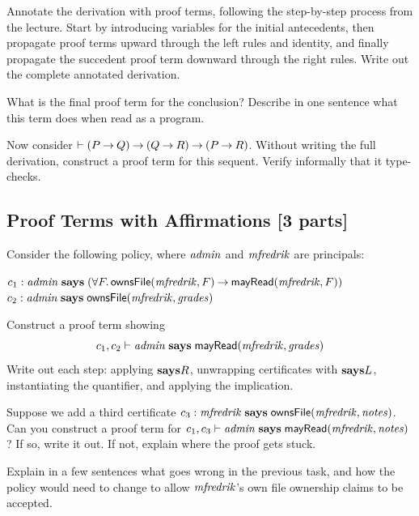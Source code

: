 \documentclass[11pt]{article}
\begin{document}
\begin{task}\rm
  Annotate the derivation with proof terms, following the step-by-step
  process from the lecture.  Start by introducing variables for the
  initial antecedents, then propagate proof terms upward through the
  left rules and identity, and finally propagate the succedent proof
  term downward through the right rules.  Write out the complete
  annotated derivation.
\end{task}

\begin{task}\rm
  What is the final proof term for the conclusion?  Describe in one
  sentence what this term does when read as a program.
\end{task}

\begin{task}\rm
  Now consider $\vdash (P \mathbin{\rightarrow} Q) \mathbin{\rightarrow} (Q \mathbin{\rightarrow} R) \mathbin{\rightarrow} (P \mathbin{\rightarrow} R)$.
  Without writing the full derivation, construct a proof term for this
  sequent.  Verify informally that it type-checks.
\end{task}

\subsection{Proof Terms with Affirmations [3 parts]}

Consider the following policy, where $\mathit{admin}$ and $\mathit{mfredrik}$ are
principals:
\begin{tabbing}
  \quad $c_1 : \mathit{admin} \mathrel{\mathbf{says}} (\forall F.\, \mathsf{ownsFile}(\mathit{mfredrik}, F) \mathbin{\rightarrow} \mathsf{mayRead}(\mathit{mfredrik}, F))$ \\
  \quad $c_2 : \mathit{admin} \mathrel{\mathbf{says}} \mathsf{ownsFile}(\mathit{mfredrik}, \mathit{grades})$
\end{tabbing}

\begin{task}\rm
  Construct a proof term showing
  \[
    c_1, c_2 \vdash \mathit{admin} \mathrel{\mathbf{says}} \mathsf{mayRead}(\mathit{mfredrik}, \mathit{grades})
  \]
  Write out each step: applying $\mathbf{says}R$, unwrapping certificates
  with $\mathbf{says}L$, instantiating the quantifier, and applying the
  implication.
\end{task}

\begin{task}\rm
  Suppose we add a third certificate
  $c_3 : \mathit{mfredrik} \mathrel{\mathbf{says}} \mathsf{ownsFile}(\mathit{mfredrik}, \mathit{notes})$.
  Can you construct a proof term for
  $c_1, c_3 \vdash \mathit{admin} \mathrel{\mathbf{says}} \mathsf{mayRead}(\mathit{mfredrik}, \mathit{notes})$?
  If so, write it out.  If not, explain where the proof gets stuck.
\end{task}

\begin{task}\rm
  Explain in a few sentences what goes wrong in the previous task,
  and how the policy would need to change to allow $\mathit{mfredrik}$'s
  own file ownership claims to be accepted.
\end{task}



\end{document}
